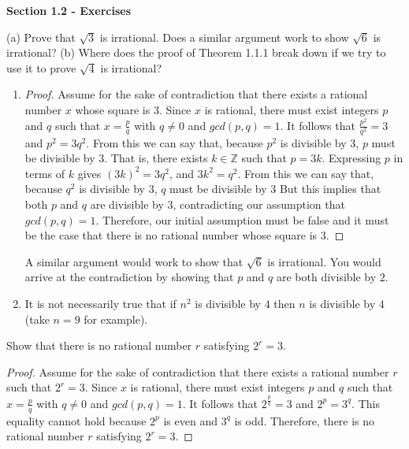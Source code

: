 \documentclass[11pt]{article}
\newcommand{\mytitlecompact}[1]{{

\hfill
{\Large \sffamily \bfseries{#1}}
\hfill
}}
\def\Z{{\mathbb{Z}}}
\newenvironment{exer}[1]
    {\renewcommand\theinnercustomexer{#1}\innercustomexer\upshape}
    {\endinnercustomexer}
\begin{document}
\mytitlecompact{Section 1.2 - Exercises}

\begin{exer}{1.2.1}
    (a) Prove that $\sqrt{3}$ is irrational. Does a similar argument work to show $\sqrt{6}$ is irrational? (b) Where does the proof of Theorem 1.1.1 break down if we try to use it to prove $\sqrt{4}$ is irrational?
    \begin{enumerate}
        \item[(a)]
            \begin{proof}
                Assume for the sake of contradiction that there exists a rational number $x$ whose square is $3$. Since $x$ is rational, there must exist integers $p$ and $q$ such that $x=\frac{p}{q}$ with $q\neq 0$ and $gcd(p,q)=1$. It follows that $\frac{p^2}{q^2}=3$ and $p^2=3q^2$. From this we can say that, because $p^2$ is divisible by $3$, $p$ must be divisible by $3$. That is, there exists $k\in\Z$ such that $p=3k$. Expressing $p$ in terms of $k$ gives $(3k)^2=3q^2$, and $3k^2=q^2$. From this we can say that, because $q^2$ is divisible by $3$, $q$ must be divisible by $3$ But this implies that both $p$ and $q$ are divisible by $3$, contradicting our assumption that $gcd(p,q)=1$. Therefore, our initial assumption must be false and it must be the case that there is no rational number whose square is $3$.
            \end{proof}
            A similar argument would work to show that $\sqrt{6}$ is irrational. You would arrive at the contradiction by showing that $p$ and $q$ are both divisible by $2$.
        \item[(b)]
            It is not necessarily true that if $n^2$ is divisible by $4$ then $n$ is divisible by $4$ (take $n=9$ for example).
    \end{enumerate}
\end{exer}
\begin{exer}{1.2.2}
    Show that there is no rational number $r$ satisfying $2^r=3$.
    \begin{proof}
        Assume for the sake of contradiction that there exists a rational number $r$ such that $2^r=3$. Since $x$ is rational, there must exist integers $p$ and $q$ such that $x=\frac{p}{q}$ with $q\neq 0$ and $gcd(p,q)=1$. It follows that $2^{\frac{p}{q}}=3$ and $2^p=3^q$. This equality cannot hold because $2^p$ is even and $3^q$ is odd. Therefore, there is no rational number $r$ satisfying $2^r=3$.
    \end{proof}
\end{exer}
\end{document}

